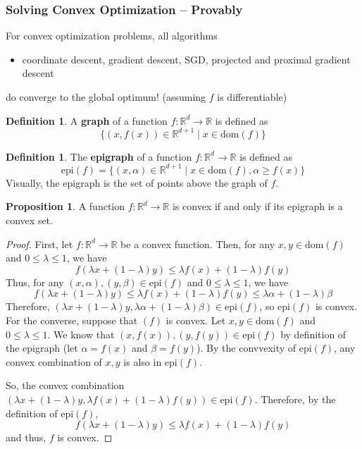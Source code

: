 \documentclass[10pt]{article}
\newcommand{\R}{\mathbb{R}}
\theoremstyle{remark}
\theoremstyle{definition}
\newtheorem{definition}[theorem]{Definition}
\newtheorem{prop}[theorem]{Proposition}
\begin{document}
\subsubsection{Solving Convex Optimization -- Provably}
For convex optimization problems, all algorithms 
\begin{itemize}
	\item coordinate descent, gradient descent, SGD, projected and proximal gradient descent
\end{itemize}
\noindent do converge to the global optimum! (assuming $f$ is differentiable)

\begin{definition}
	A \textbf{graph} of a function $f: \R^d \to \R$ is defined as 
	\[ \{ (x, f(x)) \in \R^{d+1} \mid x \in \text{dom}(f) \} \]
\end{definition}
\begin{definition}
	The \textbf{epigraph} of a function $f: \R^d \to \R$ is defined as
	\[ \text{epi}(f) = \{ (x,\alpha) \in \R^{d+1} \mid x \in \text{dom}(f), \alpha \geq f(x) \} \]
	Visually, the epigraph is the set of points above the graph of $f$.
\end{definition}
\begin{prop}
	A function $f: \R^d \to \R$ is convex if and only if its epigraph is a convex set.
\end{prop}
\begin{proof}
	First, let $f: \R^d \to \R$ be a convex function. Then, for any 
	$x,y \in \text{dom}(f)$ and $0 \leq \lambda \leq 1$, we have
	\[ f(\lambda x + (1-\lambda)y) \leq \lambda f(x) + (1-\lambda)f(y) \]
	Thus, for any $(x, \alpha), (y, \beta) \in \text{epi}(f)$ and $0 \leq \lambda \leq 1$, we have
	\[ f(\lambda x + (1-\lambda)y) \leq \lambda f(x) + (1-\lambda)f(y) \leq \lambda \alpha + (1-\lambda)\beta \]
	Therefore, $(\lambda x + (1-\lambda)y, \lambda \alpha + (1-\lambda)\beta) \in \text{epi}(f)$, so $\text{epi}(f)$ is convex.\\

	For the converse, suppose that $(f)$ is convex. Let $x,y \in \text{dom}(f)$ and $0 \leq \lambda \leq 1$.
	We know that $(x,f(x)), (y,f(y)) \in \text{epi}(f)$ by definition of the epigraph (let $\alpha = f(x)$ and $\beta = f(y)$).
	By the convvexity of $\text{epi}(f)$, any convex combination of $x,y$ is also in $\text{epi}(f)$. 

	So, the convex combination $(\lambda x + (1-\lambda)y, \lambda f(x)+ (1-\lambda)f(y)) \in \text{epi}(f)$.
	Therefore, by the definition of $\text{epi}(f)$,
	\[ f(\lambda x + (1-\lambda)y) \leq \lambda f(x) + (1-\lambda)f(y) \]
	\noindent and thus, $f$ is convex.
\end{proof}
\end{document}
